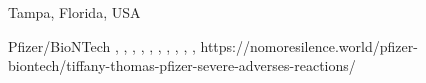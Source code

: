           {
            Tampa, Florida, USA
          }
          {
            
          }
          {
            Pfizer/BioNTech
          }
          {
          }
          {
            ,
            ,
            ,
            ,
            ,
            ,
            ,
            ,
            ,
            ,
          }
          {
            https://nomoresilence.world/pfizer-biontech/tiffany-thomas-pfizer-severe-adverses-reactions/
          }

